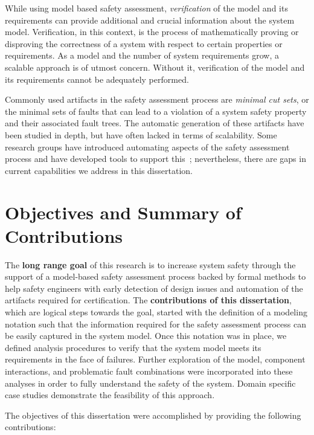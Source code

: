 While using model based safety assessment, \emph{verification} of the model and its requirements can provide additional and crucial information about the system model. Verification, in this context, is the process of mathematically proving or disproving the correctness of a system with respect to certain properties or requirements. As a model and the number of system requirements grow, a scalable approach is of utmost concern. Without it, verification of the model and its requirements cannot be adequately performed. 

Commonly used artifacts in the safety assessment process are \emph{minimal cut sets}, or the minimal sets of faults that can lead to a violation of a system safety property and their associated fault trees. The automatic generation of these artifacts have been studied in depth, but have often lacked in terms of scalability\cite{minato2001zero,vesely1981fault,jung2008fast,matuzas2015dynamic,Bieber04safetyassessment}. Some research groups have introduced automating aspects of the safety assessment process and have developed tools to support this~\cite{Joshi05:SafeComp,CAV2015:BoCiGrMa,10.1007/978-3-319-11936-6-7}; nevertheless, there are gaps in current capabilities we address in this dissertation. 

\section{Objectives and Summary of Contributions}
The \textbf{long range goal} of this research is to increase system safety through the support of a model-based safety assessment process backed by formal methods to help safety engineers with early detection of design issues and automation of the artifacts required for certification. The \textbf{contributions of this dissertation}, which are logical steps towards the goal, started with the definition of a modeling notation such that the information required for the safety assessment process can be easily captured in the system model. Once this notation was in place, we defined analysis procedures to verify that the system model meets its requirements in the face of failures. Further exploration of the model, component interactions, and problematic fault combinations were incorporated into these analyses in order to fully understand the safety of the system. Domain specific case studies demonstrate the feasibility of this approach.

The objectives of this dissertation were accomplished by providing the following contributions: 

